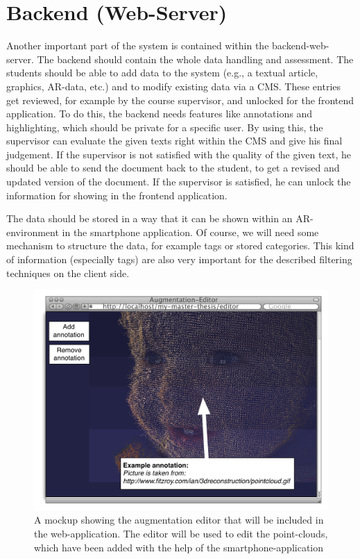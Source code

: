 \section{Backend (Web-Server)}
Another important part of the system is contained within the backend-web-server. The backend should contain the whole data handling and assessment. The students should be able to add data to the system (e.g., a textual article, graphics, \ac{AR}-data, etc.) and to modify existing data via a \ac{CMS}. These entries get reviewed, for example by the course supervisor, and unlocked for the frontend application. To do this, the backend needs features like annotations and highlighting, which should be private for a specific user. By using this, the supervisor can evaluate the given texts right within the \ac{CMS} and give his final judgement. If the supervisor is not satisfied with the quality of the given text, he should be able to send the document back to the student, to get a revised and updated version of the document. If the supervisor is satisfied, he can unlock the information for showing in the frontend application.

The data should be stored in a way that it can be shown within an \ac{AR}-environment in the smartphone application. Of course, we will need some mechanism to structure the data, for example tags or stored categories. This kind of information (especially tags) are also very important for the described filtering techniques on the client side.

\begin{figure}[th]
\centerline{\includegraphics[width=1\textwidth]{gfx/mockup_web_1}}
\caption{A mockup showing the augmentation editor that will be included in the web-application. The editor will be used to edit the point-clouds, which have been added with the help of the smartphone-application}
\label{web1}
\end{figure}

